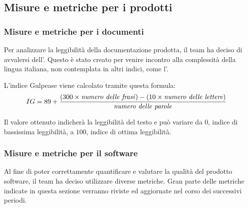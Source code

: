 \newpage

	\subsection{Misure e metriche per i prodotti}
		\subsubsection{Misure e metriche per i documenti}
			Per analizzare la leggibilità della documentazione prodotta, il team \GroupName{} ha deciso di 
			avvalersi dell'. Questo è stato creato per venire incontro alla 
			complessità della lingua italiana, non contemplata in altri indici, come l'.

			L'indice Gulpease viene calcolato tramite questa formula:
			\[ IG = 89 + \frac{(300 \times \mbox{\textit{numero delle frasi}}) - (10 \times \mbox{\textit{numero delle lettere}})}{\mbox{\textit{numero delle parole}}} \]

			Il valore ottenuto indicherà la leggibilità del testo e può variare da $0$, indice di bassissima 
			leggibilità, a $100$, indice di ottima leggibilità.

	\subsubsection{Misure e metriche per il software}
		Al fine di poter correttamente quantificare e valutare la qualità del prodotto software, il 
		team \GroupName{} ha deciso utilizzare diverse metriche. Gran parte delle metriche indicate in 
		questa sezione verranno riviste ed aggiornate nel corso dei successivi periodi.

